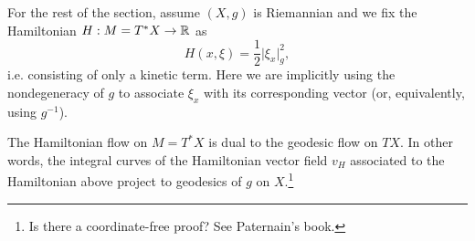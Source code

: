 \documentclass{amsart}
\begin{document}
For the rest of the section, assume $(X,g)$ is Riemannian and we fix the Hamiltonian $H:M=T^*X\to\mathbb{R}$ as
\begin{equation*}
    H(x,\xi)=\frac{1}{2}\big|\xi_x\big|^2_g,
\end{equation*}
i.e. consisting of only a kinetic term. Here we are implicitly using the nondegeneracy of $g$
to associate $\xi_x$ with its corresponding vector (or, equivalently, using $g^{-1}$).

\begin{proposition}
    The Hamiltonian flow on $M=T^*X$ is dual to the geodesic flow on $TX$. In other words, the integral
    curves of the Hamiltonian vector field $v_H$ associated to the Hamiltonian above project to geodesics
    of $g$ on $X$.\footnote{Is there a coordinate-free proof? See Paternain's book.}
\end{proposition}
\end{document}
